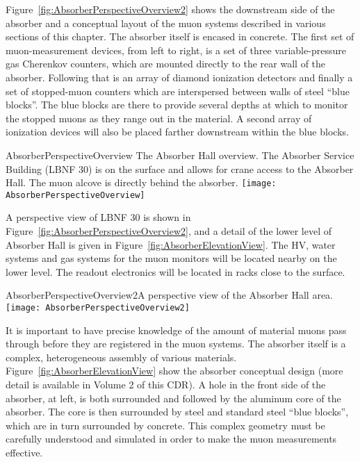 Figure~\ref{fig:AbsorberPerspectiveOverview2} shows the downstream side of the
absorber and a conceptual layout of the muon systems described in various sections of this
chapter.  
The absorber itself is encased in concrete. The first set of
muon-measurement devices, from left to right, is a
set of three variable-pressure gas Cherenkov counters, which are
mounted directly to the rear wall of the absorber. Following that is an
array of diamond ionization detectors and finally a set of stopped-muon 
counters which are interspersed between walls of
steel ``blue blocks''.   The blue blocks are there to provide several
depths at which to monitor the stopped muons as they range out in the
material. A second array of ionization devices will also be placed farther downstream within the blue blocks.


\begin{cdrfigure}{AbsorberPerspectiveOverview}
{The Absorber Hall overview. The Absorber Service Building (LBNF 30) is on the surface and allows for crane access to the Absorber Hall. The muon alcove is directly behind the absorber. }
\texttt{[image: AbsorberPerspectiveOverview]}
\end{cdrfigure}

A perspective view of LBNF 30 is shown in Figure~\ref{fig:AbsorberPerspectiveOverview2}, 
and a detail of the lower level of Absorber Hall
is given in Figure~\ref{fig:AbsorberElevationView}.  The HV, water systems 
and gas systems for the muon monitors will be located nearby on the lower level.
The readout electronics will be located in racks close to the surface. 

\begin{cdrfigure}{AbsorberPerspectiveOverview2}{A perspective view of the Absorber Hall area.}
\texttt{[image: AbsorberPerspectiveOverview2]}
\end{cdrfigure}

It is important to have precise knowledge of the amount of material muons pass
through before they are registered in the muon systems. The absorber
itself is a complex, heterogeneous assembly of various materials. 
Figure~\ref{fig:AbsorberElevationView} show the absorber conceptual 
design (more detail is available in Volume 2 of this CDR). A hole
in the front side of the absorber, at left, is both surrounded and followed by the
aluminum core of the absorber. The core is then surrounded by steel 
and standard steel ``blue blocks'', 
which are in turn surrounded by concrete.  This
complex geometry must be carefully understood and simulated in order
to make the muon measurements effective. 


